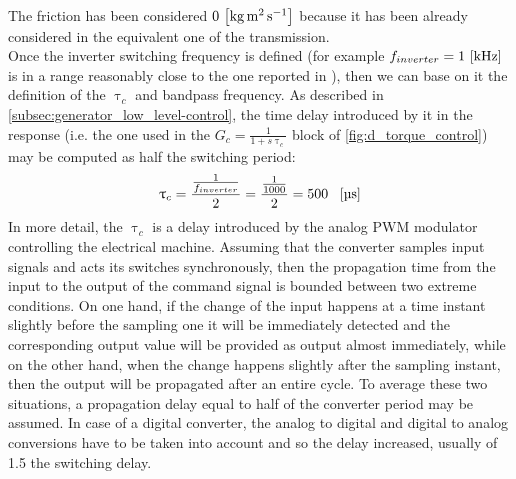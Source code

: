 The friction has been considered $ 0 \, \left[\si{\kilo\gram\square\meter\per\second}\right]$ because it has been already considered in the equivalent one of the transmission. \\
 Once the inverter switching frequency is defined (for example $f_{inverter}=1\, \left[\si{\kilo\hertz}\right]$ is in a range reasonably close to the one reported in \cite{ABB_manual}), then we can base on it the definition of the $\uptau_c$ and bandpass frequency. As described in \autoref{subsec:generator_low_level-control}, the time delay introduced by it in the response (i.e. the one used in the $G_c=\frac{1}{1+s\uptau_c}$ block of \autoref{fig:d_torque_control}) may be computed as half the switching period:
 \begin{gather}
 \uptau_{c}=\frac{\frac{1}{f_{inverter}}}{2}=\frac{\frac{1}{1000}}{2}=500 \ \ \left[\si{\micro \second}\right]
 \end{gather}
 In more detail, the $\uptau_c$ is a delay introduced by the analog PWM modulator controlling the electrical machine. Assuming that the converter samples input signals and acts its switches synchronously, then the propagation time from the input to the output of the command signal is bounded between two extreme conditions. On one hand, if the change of the input happens at a time instant slightly before the sampling one it will be immediately detected and the corresponding output value will be provided as output almost immediately, while on the other hand, when the change happens slightly after the sampling instant, then the output will be propagated after an entire cycle. To average these two situations, a propagation delay equal to half of the converter period may be assumed. In case of a digital converter, the analog to digital and digital to analog conversions have to be taken into account and so the delay increased, usually of 1.5 the switching delay.
 
